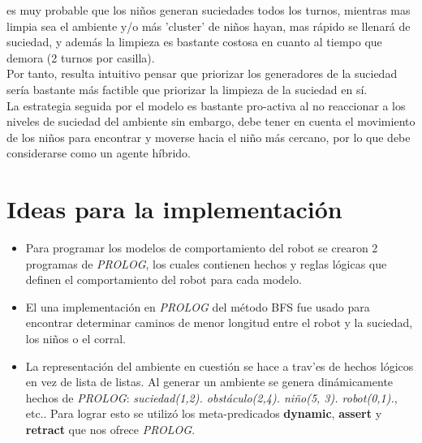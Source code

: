 \documentclass[12pt]{article}
\begin{document}
\begin{itemize}
	es muy probable que los ni\~nos generan suciedades todos los turnos, mientras mas limpia sea el ambiente y/o m\'as
	'cluster' de ni\~nos hayan, mas r\'apido se llenar\'a de suciedad, y adem\'as la limpieza es bastante costosa en 
	cuanto al tiempo que demora (2 turnos por casilla).\\
	Por tanto, resulta intuitivo pensar que priorizar los generadores de la suciedad ser\'ia bastante m\'as factible que
	priorizar la limpieza de la suciedad en s\'i.\\
	La estrategia seguida por el modelo es bastante pro-activa al no reaccionar a los niveles de suciedad del ambiente 
	sin embargo, debe tener en cuenta el movimiento de los ni\~nos para encontrar y moverse hacia el ni\~no m\'as cercano,
	por lo que debe considerarse como un agente h\'ibrido. 
\end{itemize}

\section{Ideas para la implementaci\'on}
	\begin{itemize}
		\item Para programar los modelos de comportamiento del robot se crearon
		2 programas de \textit{PROLOG}, los cuales contienen hechos y reglas l\'ogicas que
		definen el comportamiento del robot para cada modelo.
		\item El una implementaci\'on en \textit{PROLOG} del m\'etodo BFS fue usado para 
		encontrar determinar caminos de menor longitud entre el robot y la suciedad,
		los ni\~nos o el corral.
		\item La representaci\'on del ambiente en cuesti\'on se hace a trav'es de
		hechos l\'ogicos en vez de lista de listas. Al generar un ambiente se
		genera din\'amicamente hechos de \textit{PROLOG}: \textit{suciedad(1,2). 
		obst\'aculo(2,4). ni\~no(5, 3). robot(0,1).}, etc.. Para lograr esto se
		utiliz\'o los meta-predicados  \textbf{dynamic}, \textbf{assert} y \textbf{retract}
		que nos ofrece \textit{PROLOG}.
	\end{itemize}
\end{document}
